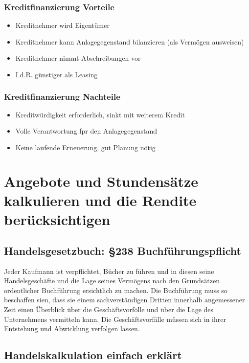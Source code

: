 \documentclass[a4paper, 12pt]{report}
\begin{document}
\subsubsection{Kreditfinanzierung Vorteile}
\begin{itemize}
    \item Kreditnehmer wird Eigentümer
    \item Kreditnehmer kann Anlagegegenstand bilanzieren (als Vermögen 
        ausweisen)
    \item Kreditnehmer nimmt Abschreibungen vor
    \item I.d.R. günstiger als Leasing
\end{itemize}

\subsubsection{Kreditfinanzierung Nachteile}
\begin{itemize}
    \item Kreditwürdigkeit erforderlich, sinkt mit weiterem Kredit
    \item Volle Verantwortung fpr den Anlagegegenstand
    \item Keine laufende Erneuerung, gut Planung nötig
\end{itemize}

\section{Angebote und Stundensätze kalkulieren und die Rendite berücksichtigen}
\subsection{Handelsgesetzbuch: \S 238 Buchführungspflicht}

Jeder Kaufmann ist verpflichtet, Bücher zu führen und in diesen seine 
Handelsgeschäfte und die Lage seines Vermögens nach den Grundsätzen ordentlicher 
Buchführung ersichtlich zu machen. Die Buchführung muss so beschaffen sien, dass 
sie einem sachverständigen Dritten innerhalb angemessener Zeit einen Überblick 
über die Geschäftsvorfölle und über die Lage des Unternehmens vermitteln kann. 
Die Geschäftsvorfälle müssen sich in ihrer Entstehung und Abwicklung verfolgen
lassen.  

\subsection{Handelskalkulation einfach erklärt}
\end{document}
